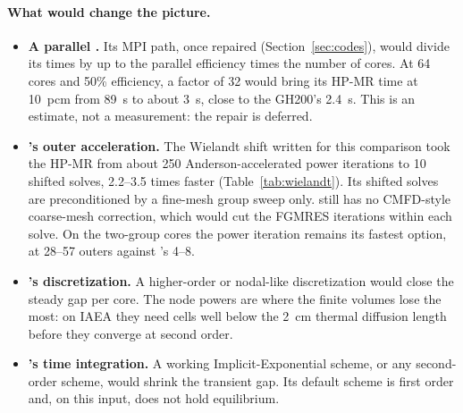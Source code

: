 \paragraph{What would change the picture.}
\begin{itemize}
\item \textbf{A parallel \ffn.} Its MPI path, once repaired (Section~\ref{sec:codes}),
  would divide its times by up to the parallel efficiency times the number
  of cores. At 64 cores and 50\% efficiency, a factor of 32 would bring its
  HP-MR time at 10~pcm from 89~s to about 3~s, close to the GH200's 2.4~s.
  This is an estimate, not a measurement: the repair is deferred.
\item \textbf{\garnet's outer acceleration.} The Wielandt shift written for
  this comparison took the HP-MR from about 250 Anderson-accelerated power
  iterations to 10 shifted solves, 2.2--3.5 times faster
  (Table~\ref{tab:wielandt}). Its shifted solves are preconditioned by a
  fine-mesh group sweep only. \garnet{} still has no CMFD-style coarse-mesh
  correction, which would cut the FGMRES iterations within each solve. On the
  two-group cores the power iteration remains its fastest option, at 28--57
  outers against \ffn's 4--8.
\item \textbf{\garnet's discretization.} A higher-order or nodal-like
  discretization would close the steady gap per core. The node powers are
  where the finite volumes lose the most: on IAEA they need cells well below
  the 2~cm thermal diffusion length before they converge at second order.
\item \textbf{\ffn's time integration.} A working Implicit-Exponential scheme,
  or any second-order scheme, would shrink the transient gap. Its default
  scheme is first order and, on this input, does not hold equilibrium.
\end{itemize}

